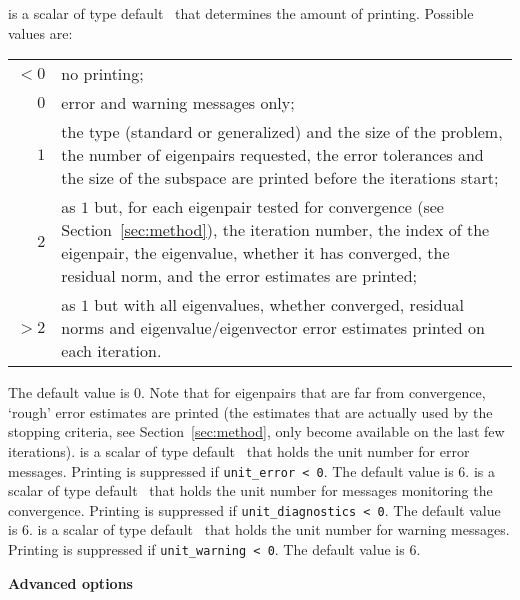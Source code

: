\begin{description}
%
 is a scalar of type default \Integer\ that
determines the amount of printing.
Possible values are:\\
%
\begin{tabular}{r@{ : }p{}}
$<0$ & no printing;\\
$0$ & error and warning messages only;\\
$1$ & the type (standard or generalized) and the size of the problem,
   the number of eigenpairs requested, the error tolerances and
   the size of the subspace are printed before the iterations start;\\
$2$ & as $1$ but, for each eigenpair tested for convergence
   (see Section~\ref{sec:method}), the iteration number, the index of 
   the eigenpair, the eigenvalue, whether it has converged, the residual norm,
   and the error estimates are printed;\\
$>2$ & as $1$ but with all eigenvalues, whether converged, residual norms
   and eigenvalue/eigenvector error estimates printed on each iteration. 
\end{tabular}

\noindent
The default value is 0.
Note that for eigenpairs that are far from convergence,
`rough' error estimates are printed
(the estimates that are actually used by the stopping criteria,
see Section~\ref{sec:method}, only become available on the last few
iterations).
%
 is a scalar of type default \Integer\ that
holds the unit number for error messages.
Printing is suppressed if {\tt unit\_error < 0}.
The default value is 6. 
%
 is a scalar of type default \Integer\ that
holds the unit number for messages  monitoring the convergence.
Printing is suppressed if {\tt unit\_diagnostics < 0}.
The default value is 6. 
%
 is a scalar of type default \Integer\ that
holds the unit number for warning messages.
Printing is suppressed if {\tt unit\_warning < 0}.
The default value is 6. 
%
\end{description}

\medskip
\noindent
{\bf Advanced options}

